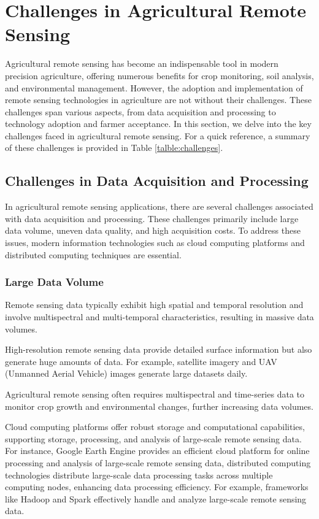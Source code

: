 
\section{Challenges in Agricultural Remote Sensing}
Agricultural remote sensing has become an indispensable tool in modern precision agriculture, offering numerous benefits for crop monitoring, soil analysis, and environmental management. However, the adoption and implementation of remote sensing technologies in agriculture are not without their challenges. These challenges span various aspects, from data acquisition and processing to technology adoption and farmer acceptance. In this section, we delve into the key challenges faced in agricultural remote sensing. For a quick reference, a summary of these challenges is provided in Table \ref{talble:challenges}.

\subsection{Challenges in Data Acquisition and Processing}

In agricultural remote sensing applications, there are several challenges associated with data acquisition and processing. These challenges primarily include large data volume, uneven data quality, and high acquisition costs. To address these issues, modern information technologies such as cloud computing platforms and distributed computing techniques are essential\cite{begueRemoteSensingCropping2018}.

\subsubsection{Large Data Volume}

Remote sensing data typically exhibit high spatial and temporal resolution and involve multispectral and multi-temporal characteristics, resulting in massive data volumes.


High-resolution remote sensing data provide detailed surface information but also generate huge amounts of data. For example, satellite imagery and UAV (Unmanned Aerial Vehicle)\cite{Unmanned27:online} images generate large datasets daily.


Agricultural remote sensing often requires multispectral and time-series data to monitor crop growth and environmental changes, further increasing data volumes.

Cloud computing platforms offer robust storage and computational capabilities, supporting storage, processing, and analysis of large-scale remote sensing data. For instance, Google Earth Engine provides an efficient cloud platform for online processing and analysis of large-scale remote sensing data, distributed computing technologies distribute large-scale data processing tasks across multiple computing nodes, enhancing data processing efficiency\cite{ozdoganRemoteSensingIrrigated2010}. For example, frameworks like Hadoop and Spark effectively handle and analyze large-scale remote sensing data.

